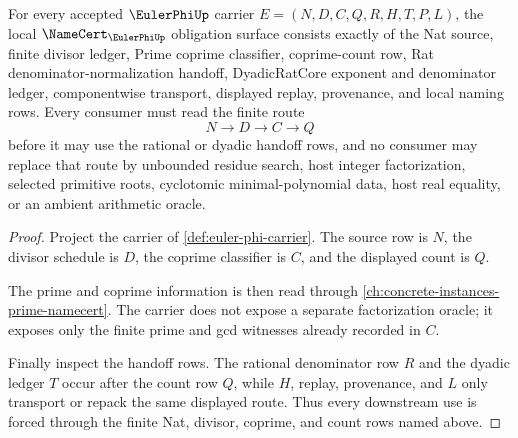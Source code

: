 \begin{theorem}
\label{thm:euler-phi-namecert-obligations}
For every accepted $\EulerPhiUp$ carrier $E=(N,D,C,Q,R,H,T,P,L)$, the local $\NameCert_{\EulerPhiUp}$ obligation surface consists exactly of the Nat source, finite divisor ledger, Prime coprime classifier, coprime-count row, Rat denominator-normalization handoff, DyadicRatCore exponent and denominator ledger, componentwise transport, displayed replay, provenance, and local naming rows. Every consumer must read the finite route
$$
N \longrightarrow D \longrightarrow C \longrightarrow Q
$$
before it may use the rational or dyadic handoff rows, and no consumer may replace that route by unbounded residue search, host integer factorization, selected primitive roots, cyclotomic minimal-polynomial data, host real equality, or an ambient arithmetic oracle.
\end{theorem}
\begin{proof}
Project the carrier of \autoref{def:euler-phi-carrier}. The source row is $N$, the divisor schedule is $D$, the coprime classifier is $C$, and the displayed count is $Q$.

The prime and coprime information is then read through \autoref{ch:concrete-instances-prime-namecert}. The carrier does not expose a separate factorization oracle; it exposes only the finite prime and gcd witnesses already recorded in $C$.

Finally inspect the handoff rows. The rational denominator row $R$ and the dyadic ledger $T$ occur after the count row $Q$, while $H$, replay, provenance, and $L$ only transport or repack the same displayed route. Thus every downstream use is forced through the finite Nat, divisor, coprime, and count rows named above.
\end{proof}

